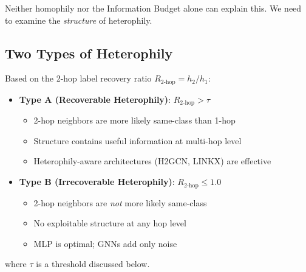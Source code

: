 Neither homophily nor the Information Budget alone can explain this. We need to examine the \textit{structure} of heterophily.

\subsection{Two Types of Heterophily}

\begin{definition}
\label{def:hetero_types}
Based on the 2-hop label recovery ratio $R_{2\text{-hop}} = h_2 / h_1$:
\begin{itemize}
    \item \textbf{Type A (Recoverable Heterophily)}: $R_{2\text{-hop}} > \tau$
    \begin{itemize}
        \item 2-hop neighbors are more likely same-class than 1-hop
        \item Structure contains useful information at multi-hop level
        \item Heterophily-aware architectures (H2GCN, LINKX) are effective
    \end{itemize}

    \item \textbf{Type B (Irrecoverable Heterophily)}: $R_{2\text{-hop}} \leq 1.0$
    \begin{itemize}
        \item 2-hop neighbors are \textit{not} more likely same-class
        \item No exploitable structure at any hop level
        \item MLP is optimal; GNNs add only noise
    \end{itemize}
\end{itemize}
where $\tau$ is a threshold discussed below.
\end{definition}

